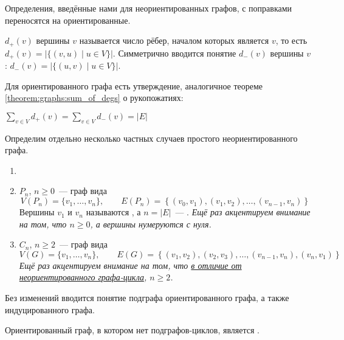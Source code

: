 Определения, введённые нами для неориентированных графов, с поправками переносятся на ориентированные.

\begin{definition}
     $ d_+(v) $ вершины $ v $ называется число рёбер, началом которых является $ v $,
    то есть $ d_+(v) = |\{ (v, u) \mid u \in V \}| $.
    Симметрично вводится понятие  $ d_-(v) $ вершины $ v $: $ d_-(v) = |\{ (u, v) \mid u \in V \}| $.
\end{definition}

Для ориентированного графа есть утверждение, аналогичное теореме \ref{theorem:graphs:sum_of_degs} о рукопожатиях:

\begin{statement}
    $ \displaystyle \sum_{v \in V} d_+(v) = \sum_{v \in V} d_-(v) = |E| $
\end{statement}

Определим отдельно несколько частных случаев простого неориентированного графа.
\begin{definition}
    \begin{enumerate}[label=\arabic*)]
        \item[]
        \item
             $ P_n $, $ n \geqslant 0 $~--- граф вида
            \[
                V(P_n) = \{ v_1, \ldots, v_n \}, \qquad
                E(P_n) = \left\{ (v_0, v_1), (v_1, v_2), \ldots, (v_{n-1}, v_n) \right\}
            \]
            Вершины $ v_1 $ и $ v_n $ называются , а $ n = |E| $~--- .
            \textit{Ещё раз акцентируем внимание на том, что $ n \geqslant 0 $, а вершины нумеруются с нуля.}
        \item
             $ C_n $, $ n \geqslant 2 $~--- граф вида
            \[
                V(G) = \{ v_1, \ldots, v_n \}, \qquad
                E(G) = \left\{ (v_1, v_2), (v_2, v_3), \ldots, (v_{n-1}, v_n), (v_n, v_1) \right\}
            \]
            \textit{Ещё раз акцентируем внимание на том, что \uline{в отличие от неориентированного графа-цикла}, $ n \geqslant 2 $.}
    \end{enumerate}
\end{definition}

Без изменений вводится понятие подграфа ориентированного графа, а также индуцированного графа.

\begin{definition}
    Ориентированный граф, в котором нет подграфов-циклов, является .
\end{definition}

